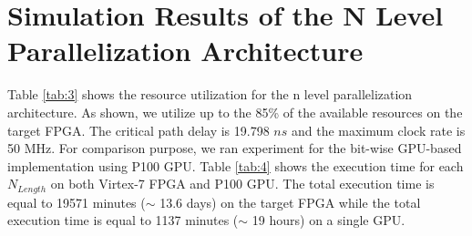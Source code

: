 \section{Simulation Results of the N Level Parallelization Architecture} \label{sec:simNlevel}
Table \ref{tab:3} shows the resource utilization for the n level parallelization architecture. As shown, we utilize up to the 85\% of the available resources on the target FPGA. The critical path delay is 19.798 $ns$ and the maximum clock rate is 50 MHz. For comparison purpose, we ran experiment for the bit-wise GPU-based implementation using P100 GPU. Table \ref{tab:4} shows the execution time for each $N_{Length}$ on both Virtex-7 FPGA and P100 GPU. The total execution time is equal to 19571 minutes ($\sim$ 13.6 days) on the target FPGA while the total execution time is equal to 1137 minutes ($\sim$ 19 hours) on a single GPU.

